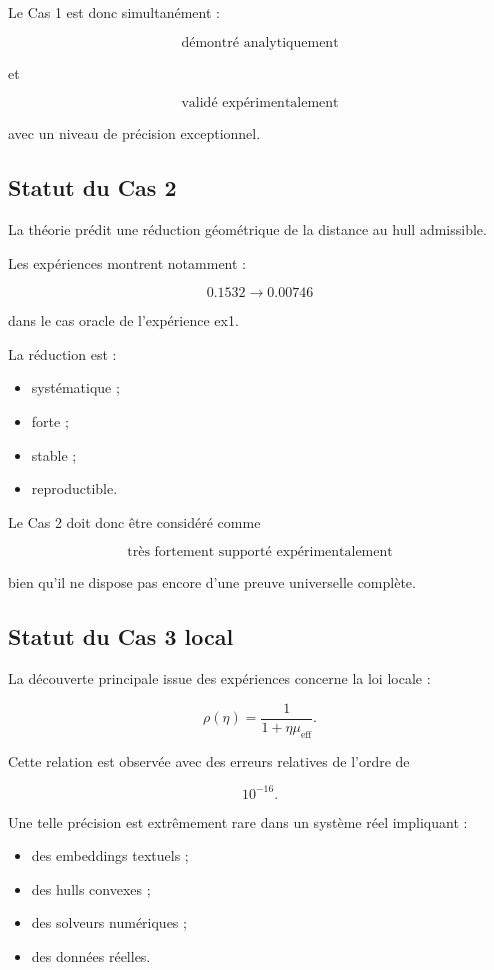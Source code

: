 Le Cas 1 est donc simultanément :

\[
\boxed{
\text{démontré analytiquement}
}
\]

et

\[
\boxed{
\text{validé expérimentalement}
}
\]

avec un niveau de précision exceptionnel.

\subsection{Statut du Cas 2}

La théorie prédit une réduction géométrique de la distance au hull admissible.

Les expériences montrent notamment :

\[
0.1532
\rightarrow
0.00746
\]

dans le cas oracle de l'expérience ex1.

La réduction est :

\begin{itemize}
    \item systématique ;
    \item forte ;
    \item stable ;
    \item reproductible.
\end{itemize}

Le Cas 2 doit donc être considéré comme

\[
\boxed{
\text{très fortement supporté expérimentalement}
}
\]

bien qu'il ne dispose pas encore d'une preuve universelle complète.

\subsection{Statut du Cas 3 local}

La découverte principale issue des expériences concerne la loi locale :

\[
\rho(\eta)
=
\frac{1}{1+\eta\mu_{\mathrm{eff}}}.
\]

Cette relation est observée avec des erreurs relatives de l'ordre de

\[
10^{-16}.
\]

Une telle précision est extrêmement rare dans un système réel impliquant :

\begin{itemize}
    \item des embeddings textuels ;
    \item des hulls convexes ;
    \item des solveurs numériques ;
    \item des données réelles.
\end{itemize}

